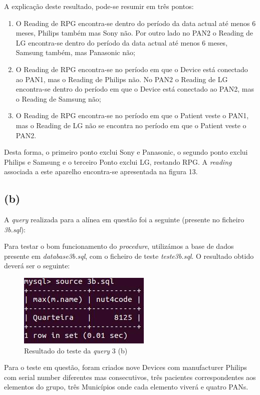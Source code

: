 \documentclass[a4paper]{article}
\begin{document}
A explicação deste resultado, pode-se resumir em três pontos:

\begin{enumerate}
\item O Reading de RPG encontra-se dentro do período da data actual até 
	menos 6 meses, Philips também mas Sony não. Por outro lado no PAN2
	o Reading de LG encontra-se dentro do período da data actual até 
	menos 6 meses, Samsung também, mas Panasonic não;
\item O Reading de RPG encontra-se no período em que o Device está 
	conectado ao PAN1, mas o Reading de Philips não. No PAN2 o Reading
	de LG encontra-se dentro do período em que o Device está conectado  
	ao PAN2, mas o Reading de Samsung não;
\item O Reading de RPG encontra-se no período em que o Patient veste o
	PAN1, mas o Reading de LG não se encontra no período em que o Patient
	veste o PAN2.
\end{enumerate}

Desta forma, o primeiro ponto exclui Sony e Panasonic, o segundo ponto exclui Philips e Samsung e o terceiro Ponto exclui LG, restando RPG. A \textit{reading} associada a este aparelho encontra-se apresentada na figura 13.

\subsection*{(b)}
A \textit{query} realizada para a alínea em questão foi a seguinte (presente no ficheiro \textit{3b.sql}):



Para testar o bom funcionamento do \textit{procedure}, utilizámos a base de dados presente em \textit{database3b.sql}, com o ficheiro de teste \textit{teste3b.sql}.
\vskip 5mm
O resultado obtido deverá ser o seguinte:

\begin{figure}[ht!]
\centering
\includegraphics[scale=0.53]{3b.jpg}
\caption{Resultado do teste da \textit{query} 3 (b)}
\end{figure}

Para o teste em questão, foram criados nove Devices com manufacturer Philips com serial number
	diferentes mas consecutivos, três pacientes correspondentes aos elementos
	do grupo, três Municípios onde cada elemento viverá e quatro PANs.
	
\end{document}
